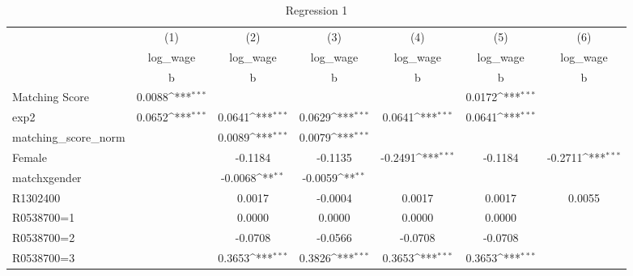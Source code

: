 \begin{table}[htbp]\centering
\def\sym#1{\ifmmode^{#1}\else\(^{#1}\)\fi}
\caption{Regression 1 \label{reg1}}
\begin{tabular}{l*{6}{c}}
\hline\hline
                    &\multicolumn{1}{c}{(1)}&\multicolumn{1}{c}{(2)}&\multicolumn{1}{c}{(3)}&\multicolumn{1}{c}{(4)}&\multicolumn{1}{c}{(5)}&\multicolumn{1}{c}{(6)}\\
                    &\multicolumn{1}{c}{log\_wage}&\multicolumn{1}{c}{log\_wage}&\multicolumn{1}{c}{log\_wage}&\multicolumn{1}{c}{log\_wage}&\multicolumn{1}{c}{log\_wage}&\multicolumn{1}{c}{log\_wage}\\
                    &           b         &           b         &           b         &           b         &           b         &           b         \\
\hline
Matching Score      &      0.0088\sym{***}&                     &                     &                     &      0.0172\sym{***}&                     \\
exp2                &      0.0652\sym{***}&      0.0641\sym{***}&      0.0629\sym{***}&      0.0641\sym{***}&      0.0641\sym{***}&                     \\
matching\_score\_norm &                     &      0.0089\sym{***}&      0.0079\sym{***}&                     &                     &                     \\
Female              &                     &     -0.1184         &     -0.1135         &     -0.2491\sym{***}&     -0.1184         &     -0.2711\sym{***}\\
matchxgender        &                     &     -0.0068\sym{**} &     -0.0059\sym{**} &                     &                     &                     \\
R1302400            &                     &      0.0017         &     -0.0004         &      0.0017         &      0.0017         &      0.0055         \\
R0538700=1          &                     &      0.0000         &      0.0000         &      0.0000         &      0.0000         &                     \\
R0538700=2          &                     &     -0.0708         &     -0.0566         &     -0.0708         &     -0.0708         &                     \\
R0538700=3          &                     &      0.3653\sym{***}&      0.3826\sym{***}&      0.3653\sym{***}&      0.3653\sym{***}&                     \\

\end{tabular}
\end{table}
